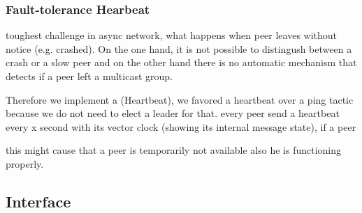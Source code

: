    \subsubsection{Fault-tolerance Hearbeat}
    toughest challenge in async network, what happens when peer leaves without notice (e.g. crashed). On the one hand, it is not possible to distingush between a crash or a slow peer and  on the other hand there is no automatic mechanism that detects if a peer left a multicast group.
    
    Therefore we implement a (Heartbeat), we favored a heartbeat over a ping tactic because we do not need to elect a leader for that. 
    every peer send a heartbeat every x second with its vector clock (showing its internal message state), if a peer 
    
    this might cause that a peer is temporarily not available also he is functioning properly.
    

    
    
    

\subsection{Interface}